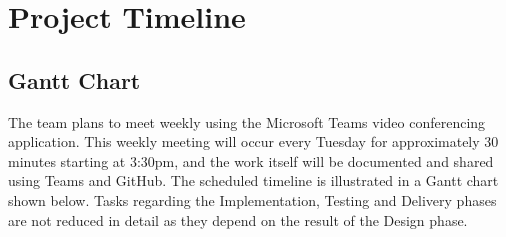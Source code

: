\clearpage
{}
\addtolength{\hoffset}{-3.0cm}
\recalctypearea
\thispagestyle{empty}
\chapter{Project Timeline}
\section{Gantt Chart}
The team plans to meet weekly using the Microsoft Teams video conferencing application. This weekly meeting will occur every Tuesday for approximately 30 minutes starting at 3:30pm, and the work itself will be documented and shared using Teams and GitHub. The scheduled timeline is illustrated in a Gantt chart shown below. Tasks regarding the Implementation, Testing and Delivery phases are not reduced in detail as they depend on the result of the Design phase. \\

